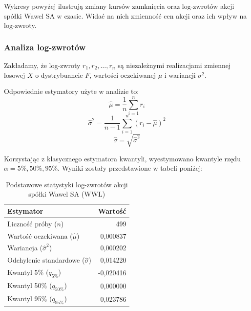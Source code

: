 \documentclass[a4paper,11pt]{article}
\begin{document}
Wykresy powyżej ilustrują zmiany kursów zamknięcia oraz log-zwrotów akcji spółki Wawel SA w czasie. Widać na nich zmienność cen akcji oraz ich wpływ na log-zwroty.

\subsubsection{Analiza log-zwrotów}
Zakładamy, że log-zwroty $r_1, r_2, \ldots, r_n$ są niezależnymi realizacjami zmiennej losowej $X$ o dystrybuancie $F$, wartości oczekiwanej $\mu$ i wariancji $\sigma^2$. 

Odpowiednie estymatory użyte w analizie to:
\begin{equation}
    \hat{\mu} = \frac{1}{n} \sum_{i=1}^{n} r_i
\end{equation}
\begin{equation}
    \hat{\sigma}^2 = \frac{1}{n-1} \sum_{i=1}^{n} (r_i - \hat{\mu})^2
\end{equation}
\begin{equation}
    \hat{\sigma} = \sqrt{\hat{\sigma}^2}
\end{equation}

Korzystając z klasycznego estymatora kwantyli, wyestymowano kwantyle rzędu $\alpha = 5\%, 50\%, 95\%$. Wyniki zostały przedstawione w tabeli poniżej:

\begin{table}[H]
    \centering
    \begin{tabular}{|l|r|}
        \hline
        \textbf{Estymator} & \textbf{Wartość} \\
        \hline
        Liczność próby ($n$) & 499 \\
        Wartość oczekiwana ($\hat{\mu}$) & 0,000837 \\
        Wariancja ($\hat{\sigma}^2$) & 0,000202 \\
        Odchylenie standardowe ($\hat{\sigma}$) & 0,014220 \\
        Kwantyl 5\% ($q_{5\%}$) & -0,020416 \\
        Kwantyl 50\% ($q_{50\%}$) & 0,000000 \\
        Kwantyl 95\% ($q_{95\%}$) & 0,023786 \\
        \hline
    \end{tabular}
    \caption{Podstawowe statystyki log-zwrotów akcji spółki Wawel SA (WWL)}
    \label{tab:wyniki}
\end{table}
\end{document}
